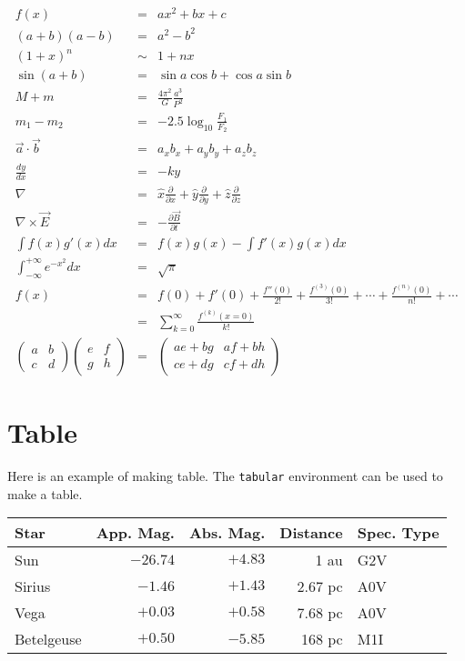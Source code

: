 \documentclass{article}
\begin{document}
 \begin{eqnarray}
  f(x) &=& a x^2 + b x + c \\
  (a+b) (a-b) &=& a^2 - b^2 \\
  (1+x)^n &\sim& 1 + nx \\
  \sin (a + b) &=& \sin a \cos b + \cos a \sin b \\
  M + m &=& \frac{4 \pi^2}{G} \frac{a^3}{P^2} \\
  m_1 - m_2 &=& -2.5 \log_{10} \frac{F_1}{F_2} \\
  \vec{a} \cdot \vec{b} &=& a_x b_x + a_y b_y + a_z b_z \\
  \frac{dy}{dx} &=& -ky \\
  \nabla &=& \hat{x} \frac{\partial}{\partial x} 
   + \hat{y} \frac{\partial}{\partial y}
   + \hat{z} \frac{\partial}{\partial z} \\
  \nabla \times \vec{E} &=& - \frac{\partial \vec{B}}{\partial t} \\
  \int f(x) g'(x) dx &=& f(x) g(x) - \int f'(x) g(x) dx \\
  \int_{-\infty}^{+\infty} e^{-x^2} dx &=& \sqrt{\pi} \\
  f(x) &=& f(0) + f'(0) + \frac{f''(0)}{2!} +
   \frac{f^{(3)}(0)}{3!} + \cdots + \frac{f^{(n)}(0)}{n!} +
   \cdots \nonumber \\
  &=& \sum_{k=0}^{\infty} \frac{f^{(k)}(x=0)}{k!} \\
  \left (
  \begin{array}{cc}
   a & b \\
   c & d
  \end{array}
  \right )
  \left (
  \begin{array}{cc}
   e & f \\
   g & h
  \end{array}
  \right )
  &=&
  \left (
  \begin{array}{cc}
   ae + bg & af + bh \\
   ce + dg & cf + dh
  \end{array}
  \right )
 \end{eqnarray}

 \section{Table}

 Here is an example of making table. The {\tt tabular} environment can
 be used to make a table.

 \begin{center}
  \begin{tabular}{|l|r|r|r|l|}
   \hline
   Star & App. Mag. & Abs. Mag. & Distance & Spec. Type \\
   \hline \hline
   Sun & $-26.74$ & $+4.83$ & 1 au & G2V \\
   Sirius & $-1.46$ & $+1.43$ & 2.67 pc & A0V \\
   Vega & $+0.03$ & $+0.58$ & 7.68 pc & A0V \\
   Betelgeuse & $+0.50$ & $-5.85$ & 168 pc & M1I \\
   \hline
  \end{tabular}
 \end{center}
\end{document}
